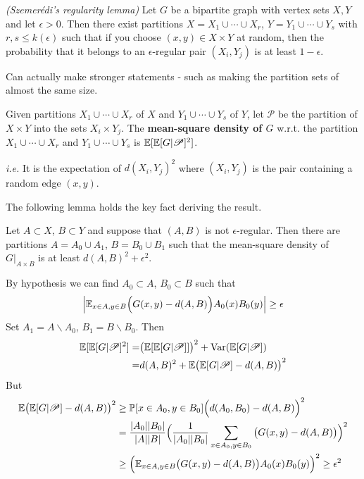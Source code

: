 \documentclass[10pt,a4paper]{report}
\newenvironment{proof}
{\begin{changemargin}{1cm}{0.5cm}
	}%
	{\end{changemargin}
}
\begin{document}
 \emph{(Szemer\'{e}di's regularity lemma)} Let $G$ be a bipartite graph with vertex sets $X,Y$ and let $\epsilon>0$. Then there exist partitions $X = X_1 \cup \cdots \cup X_r$, $Y = Y_1\cup \cdots \cup Y_s$ with $r,s\leq k(\epsilon)$ such that if you choose $(x,y) \in X\times Y$ at random, then the probability that it belongs to an $\epsilon$-regular pair $(X_i, Y_j)$ is at least $1-\epsilon$.
\s

Can actually make stronger statements - such as making the partition sets of almost the same size.
\s

 Given partitions $X_1 \cup \cdots \cup X_r$ of $X$ and $Y_1 \cup \cdots \cup Y_s$ of $Y$, let $\mathscr{P}$ be the partition of $X\times Y$ into the sets $X_i \times Y_j$. The \textbf{mean-square density of $G$} w.r.t. the partition $X_1 \cup \cdots \cup X_r$ and $Y_1 \cup \cdots \cup Y_s$ is $\mathbb{E}[\mathbb{E}[G|\mathscr{P}]^2]$.

\emph{i.e.} It is the expectation of $d(X_i, Y_j)^2$ where $(X_i, Y_j)$ is the pair containing a random edge $(x,y)$.
\s

The following lemma holds the key fact deriving the result.
\s

 Let $A\subset X$, $B\subset Y$ and suppose that $(A,B)$ is not $\epsilon$-regular. Then there are partitions $A = A_0 \cup A_1$, $B =B_0 \cup B_1$ such that the mean-square density of $G\big|_{A\times B}$ is at least $d(A,B)^2 + \epsilon^2$.
\begin{proof}
\pf By hypothesis we can find $A_0 \subset A$, $B_0\subset B$ such that 
\begin{align*}
\Big| \mathbb{E}_{x\in A, y\in B} \Big(G(x,y) - d(A,B) \Big) A_0(x) B_0(y) \Big| \geq \epsilon
\end{align*}
Set $A_1 = A \backslash A_0$, $B_1 = B \backslash B_0$. Then
\begin{align*}
\mathbb{E}[\mathbb{E}[G|\mathscr{P}]^2] =& \big( \mathbb{E}[\mathbb{E}[G|\mathscr{P}]] \big)^2 + \text{Var}(\mathbb{E}[G|\mathscr{P}]) \\
=& d(A,B)^2 + \mathbb{E} \big( \mathbb{E}[G|\mathscr{P}] - d(A,B) \big)^2
\end{align*}
But
\begin{align*}
\mathbb{E} \big( \mathbb{E}[G|\mathscr{P}] - d(A,B) \big)^2 & \geq \mathbb{P} [x\in A_0, y\in B_0] \Big( d(A_0, B_0) - d(A,B) \Big)^2 \\
& =  \frac{|A_0| |B_0|}{|A||B|} \Big( \frac{1}{|A_0||B_0|} \sum_{x\in A_0,y\in B_0} \big(G(x,y)-d(A,B)\big) \Big)^2 \\
& \geq \Big( \mathbb{E}_{x\in A, y\in B} \big(G(x,y)-d(A,B)\big) A_0(x) B_0(y) \Big)^2 \geq \epsilon^2
\end{align*}

\eop
\end{proof}
\s
\end{document}
